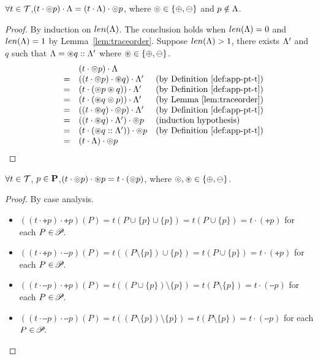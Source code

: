 {{{\begin{lemma}\label{lem:traceorder-whole}
$\forall t\in\mathcal{T}$,$(t\cdot \circledcirc p )\cdot \Lambda = (t\cdot\Lambda)\cdot \circledcirc p$, where $\circledcirc \in\{\oplus , \ominus \}$ and $p \notin \Lambda$.
\end{lemma}
\begin{proof}
By induction on $len(\Lambda)$. The conclusion holds when $len(\Lambda)=0$ and $len(\Lambda)=1$ by Lemma~\ref{lem:traceorder}. Suppose $len(\Lambda)>1$, there exists $\Lambda'$ and $q$ such that $\Lambda=\circledast q :: \Lambda'$ where $\circledast \in\{\oplus , \ominus \}$.
\begin{equation*}
\begin{array}{lcll}
&&(t\cdot\circledcirc p)\cdot \Lambda &\\
&=& ((t\cdot \circledcirc  p)  \cdot \circledast  q) \cdot \Lambda'&\text{(by Definition~\ref{def:app-pt-t})}\\
              &=& (t\cdot(\circledcirc  p\circledast  q )) \cdot \Lambda' &\text{(by Definition~\ref{def:app-pt-t})}\\
              &=& (t\cdot(\circledast  q \circledcirc  p)) \cdot \Lambda' &\text{(by Lemma \ref{lem:traceorder})}\\
              &=& ((t\cdot\circledast  q) \cdot \circledcirc  p) \cdot \Lambda' &\text{(by Definition~\ref{def:app-pt-t})}\\
              &=& ((t\cdot\circledast  q) \cdot \Lambda') \cdot \circledcirc  p  & \text{(induction hypothesis)}\\
              &=& (t\cdot (\circledast  q :: \Lambda')) \cdot \circledcirc  p &\text{(by Definition~\ref{def:app-pt-t})}\\
              &=& (t\cdot \Lambda) \cdot \circledcirc p & \text{}
\end{array}
\end{equation*}
\end{proof}

\begin{lemma}\label{lem:tracepsame}
$\forall t\in\mathcal{T}$, $p\in\mathbf{P}$,$(t \cdot \circledcirc  p)\cdot\circledast  p =  t \cdot (\circledcirc  p) $, where $\circledcirc , \circledast  \in \{\oplus ,\ominus \}$.
\end{lemma}
\begin{proof}
By case analysis.
\begin{itemize}
\item $((t\cdot \tplus{ p})\cdot \tplus{ p})(P)=t(P\cup\{p\}\cup\{p\})  = t(P\cup\{p\}) =t\cdot(\tplus{ p})$ for each $P\in\!\mathscr{P}\!$.
\item $((t\cdot \tplus{ p})\cdot \tminus{ p})(P)=t((P\setminus\{p\})\cup\{p\})  = t(P\cup\{p\}) =t\cdot(\tplus{ p})$ for each $P\in\!\mathscr{P}\!$.
\item $((t\cdot \tminus{ p})\cdot \tplus{ p})(P) = t((P\cup\{p\})\setminus\{p\})=t(P\setminus\{p\})=t\cdot(\tminus{ p})$ for each $P\in\!\mathscr{P}\!$.
\item $((t\cdot \tminus{ p})\cdot \tminus{ p})(P) = t((P\setminus\{p\})\setminus\{p\})=t(P\setminus\{p\})=t\cdot(\tminus{ p})$ for each $P\in\!\mathscr{P}\!$.
\end{itemize}
\end{proof}

}}}
